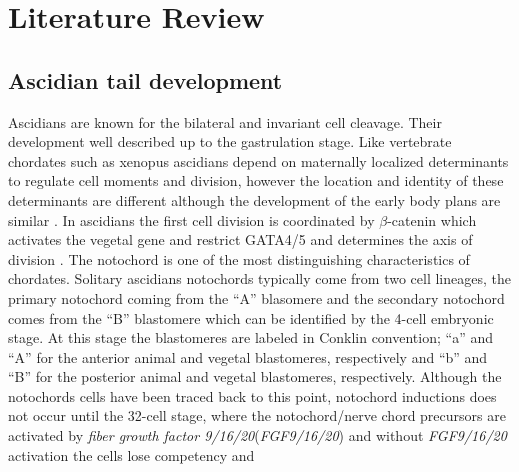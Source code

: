 \chapter{Literature Review}
\section{Ascidian tail development}

Ascidians are known for the bilateral and invariant cell cleavage. Their development well described up to the gastrulation stage\cite{nishida_cell_1983,nishida_cell_1985,nishida_cell_1987}. Like vertebrate chordates such as xenopus ascidians depend on maternally localized determinants to regulate cell moments and division, however the location and identity of these determinants are different although the development of the early body plans are similar \cite{lemaire_ascidians_2008}. In ascidians the first cell division is coordinated by  $\beta$-catenin which activates the vegetal gene and restrict GATA4/5 \cite{lemaire_unfolding_2009} and determines the axis of division \cite{imai_early_2002}. 
The notochord is one of the most distinguishing characteristics of chordates. Solitary ascidians notochords typically come from two cell lineages, the primary notochord coming from the ``A'' blasomere and the secondary notochord comes from the ``B'' blastomere \cite{nishida_cell_1983} which can be identified by the 4-cell embryonic stage. At this stage the blastomeres are labeled in Conklin \cite{conklin_organization_1905} convention; ``a'' and ``A'' for the anterior animal and vegetal blastomeres, respectively and ``b'' and ``B'' for the posterior animal and vegetal blastomeres, respectively. Although the notochords cells have been traced back to this point, notochord inductions does not occur until the 32-cell stage, where the notochord/nerve chord precursors are activated by \textit{fiber growth factor 9/16/20}(\textit{FGF9/16/20}) and without \textit{FGF9/16/20} activation the cells lose competency and  
